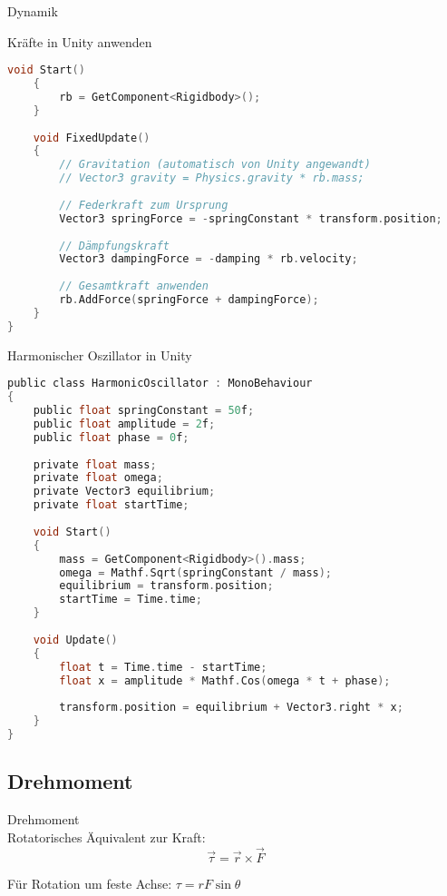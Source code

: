\begin{definition}{Dynamik}
\begin{code}{Kräfte in Unity anwenden}
\begin{lstlisting}[language=C, style=basesmol]
    void Start() 
    {
        rb = GetComponent<Rigidbody>();
    }
    
    void FixedUpdate() 
    {
        // Gravitation (automatisch von Unity angewandt)
        // Vector3 gravity = Physics.gravity * rb.mass;
        
        // Federkraft zum Ursprung
        Vector3 springForce = -springConstant * transform.position;
        
        // Dämpfungskraft
        Vector3 dampingForce = -damping * rb.velocity;
        
        // Gesamtkraft anwenden
        rb.AddForce(springForce + dampingForce);
    }
}
\end{lstlisting}
\end{code}

\begin{code}{Harmonischer Oszillator in Unity}\\
\begin{lstlisting}[language=C, style=basesmol]
public class HarmonicOscillator : MonoBehaviour 
{
    public float springConstant = 50f;
    public float amplitude = 2f;
    public float phase = 0f;
    
    private float mass;
    private float omega;
    private Vector3 equilibrium;
    private float startTime;
    
    void Start() 
    {
        mass = GetComponent<Rigidbody>().mass;
        omega = Mathf.Sqrt(springConstant / mass);
        equilibrium = transform.position;
        startTime = Time.time;
    }
    
    void Update() 
    {
        float t = Time.time - startTime;
        float x = amplitude * Mathf.Cos(omega * t + phase);
        
        transform.position = equilibrium + Vector3.right * x;
    }
}
\end{lstlisting}
\end{code}

\subsection{Drehmoment}

\begin{definition}{Drehmoment}\\
    Rotatorisches Äquivalent zur Kraft:
    $$\vec{\tau} = \vec{r} \times \vec{F}$$
    
    Für Rotation um feste Achse: $\tau = rF\sin\theta$
\end{definition}


\end{definition}
